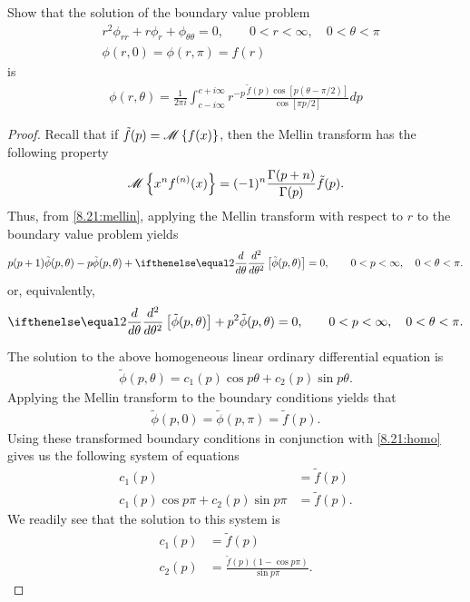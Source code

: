 \begin{problem}{8.21}
  Show that the solution of the boundary value problem
  \begin{align*}
    &r^2 \phi_{rr} + r \phi_r + \phi_{\theta\theta} = 0, \qquad 0 < r < \infty, \quad 0 < \theta < \pi \\
    &\phi(r, 0) = \phi(r, \pi) = f(r)
  \end{align*}
  is
  \begin{align*}
    \phi(r, \theta) = \frac{1}{2\pi i}\int_{c-i\infty}^{c+i\infty} r^{-p} \frac{\tilde{f}(p) \cos\left[p(\theta - \pi / 2)\right]}{\cos\left[\pi p / 2\right]} dp
  \end{align*}
\end{problem}

\begin{proof}
  Recall that if $\tilde{f}(p) = \mathscr{M}\left\{ {f(x)} \right\}$, then the Mellin transform has the following property
  \begin{align}\label{8.21:mellin}
    \mathscr{M}\left\{ {x^n f^{(n)}(x)} \right\} = (-1)^n \frac{\Gamma(p+n)}{\Gamma(p)} \tilde{f}(p).
  \end{align}
  Thus, from \eqref{8.21:mellin}, applying the Mellin transform with respect to $r$ to the boundary value problem yields
  \begin{align*}
    p(p+1)\tilde{\phi}(p, \theta) -p \tilde{\phi}(p, \theta) + \der{\theta}{2}\left[\tilde{\phi}(p, \theta)\right] = 0, \qquad 0 < p < \infty, \quad 0 < \theta < \pi.
  \end{align*}
  or, equivalently,
  \begin{align*}
    \der{\theta}{2}\left[\tilde{\phi}(p, \theta)\right] + p^2\tilde{\phi}(p, \theta)= 0, \qquad 0 < p < \infty, \quad 0 < \theta < \pi.
  \end{align*}

  The solution to the above homogeneous linear ordinary differential equation is
  \begin{align}
    \label{8.21:homo}
    \tilde{\phi}(p, \theta) = c_1(p) \cos p\theta + c_2(p) \sin p\theta.
  \end{align}
  Applying the Mellin transform to the boundary conditions yields that
  \begin{align*}
    \tilde{\phi}(p, 0) = \tilde{\phi}(p, \pi) = \tilde{f}(p).
  \end{align*}
  Using these transformed boundary conditions in conjunction with \eqref{8.21:homo} gives
  us the following system of equations
  \begin{align*}
    c_1(p) &= \tilde{f}(p) \\
    c_1(p) \cos p \pi + c_2(p) \sin p\pi &= \tilde{f}(p).
  \end{align*}
  We readily see that the solution to this system is
  \begin{align*}
    c_1(p) &= \tilde{f}(p) \\
    c_2(p) &= \frac{\tilde{f}(p)(1-\cos p \pi)}{\sin p \pi}.
  \end{align*}


\end{proof}
